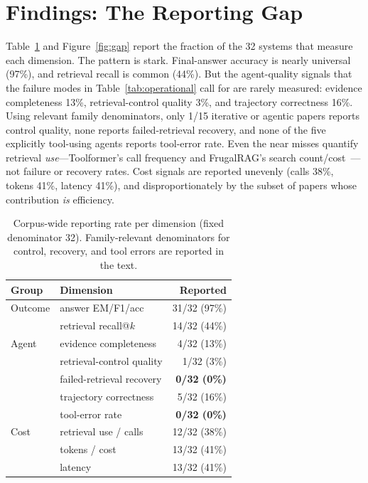 \documentclass[11pt]{article}
\begin{document}
\section{Findings: The Reporting Gap}
\label{sec:findings}
Table~\ref{tab:findings} and Figure~\ref{fig:gap} report the fraction of the 32 systems that measure
each dimension. The pattern is stark. Final-answer accuracy is nearly universal (97\%), and retrieval
recall is common (44\%). But the agent-quality signals that the failure modes in
Table~\ref{tab:operational} call for are rarely measured: evidence completeness 13\%, retrieval-control
quality 3\%, and trajectory correctness 16\%. Using relevant family denominators, only 1/15 iterative
or agentic papers reports control quality, none reports failed-retrieval recovery, and none of the five
explicitly tool-using agents reports tool-error rate. Even the near misses quantify retrieval
\emph{use}---Toolformer's call frequency and FrugalRAG's search count/cost~\citep{toolformer,frugalrag}---not
failure or recovery rates. Cost signals are reported unevenly (calls 38\%, tokens 41\%, latency 41\%),
and disproportionately by the subset of papers whose contribution
\emph{is} efficiency.

\begin{table}[t]\centering\small
\caption{Corpus-wide reporting rate per dimension (fixed denominator 32). Family-relevant denominators
for control, recovery, and tool errors are reported in the text.}
\label{tab:findings}
\begin{tabular}{@{}llr@{}}
\toprule
\textbf{Group} & \textbf{Dimension} & \textbf{Reported} \\
\midrule
Outcome & answer EM/F1/acc & 31/32 (97\%) \\
 & retrieval recall@$k$ & 14/32 (44\%) \\
\midrule
Agent & evidence completeness & 4/32 (13\%) \\
 & retrieval-control quality & 1/32 (3\%) \\
 & failed-retrieval recovery & \textbf{0/32 (0\%)} \\
 & trajectory correctness & 5/32 (16\%) \\
 & tool-error rate & \textbf{0/32 (0\%)} \\
\midrule
Cost & retrieval use / calls & 12/32 (38\%) \\
 & tokens / cost & 13/32 (41\%) \\
 & latency & 13/32 (41\%) \\
\bottomrule
\end{tabular}
\end{table}
\end{document}
